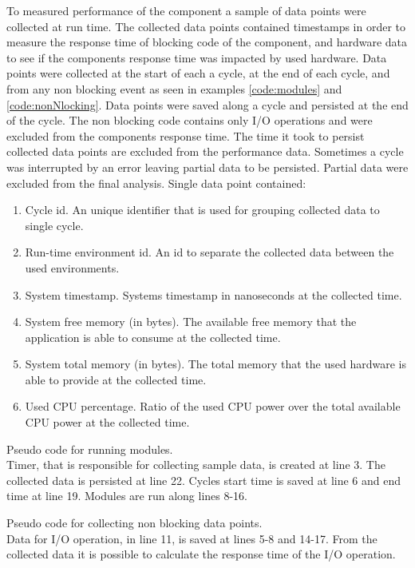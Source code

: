 To measured performance of the component a sample of data points were collected at run time.
The collected data points contained timestamps in order to measure the response time of blocking code of the component, and hardware data to see if the components response time was impacted by used hardware.
Data points were collected at the start of each a cycle, at the end of each cycle, and from any non blocking event as seen in examples \ref{code:modules} and \ref{code:nonNlocking}.
Data points were saved along a cycle and persisted at the end of the cycle.
The non blocking code contains only I/O operations and were excluded from the components response time.
The time it took to persist collected data points are excluded from the performance data.
Sometimes a cycle was interrupted by an error leaving partial data to be persisted.
Partial data were excluded from the final analysis.
Single data point contained:
\begin{enumerate}
    \item Cycle id. An unique identifier that is used for grouping collected data to single cycle.
    \item Run-time environment id. An id to separate the collected data between the used environments.
    \item System timestamp. Systems timestamp in nanoseconds at the collected time.
    \item System free memory (in bytes). The available free memory that the application is able to consume at the collected time.
    \item System total memory (in bytes). The total memory that the used hardware is able to provide at the collected time.
    \item Used CPU percentage. Ratio of the used CPU power over the total available CPU power at the collected time.
\end{enumerate}
\begin{table}[ht!]
    
    \caption{Pseudo code for running modules.
    \\ Timer, that is responsible for collecting sample data, is created at line 3.
    The collected data is persisted at line 22.
    Cycles start time is saved at line 6 and end time at line 19.
    Modules are run along lines 8-16.
    }
    \label{code:modules}
\end{table}
\begin{table}[ht!]
    
    \caption{Pseudo code for collecting non blocking data points.
    \\ Data for I/O operation, in line 11, is saved at lines 5-8 and 14-17. From the collected data it is possible to calculate the response time of the I/O operation.}
    \label{code:nonNlocking}
\end{table}

